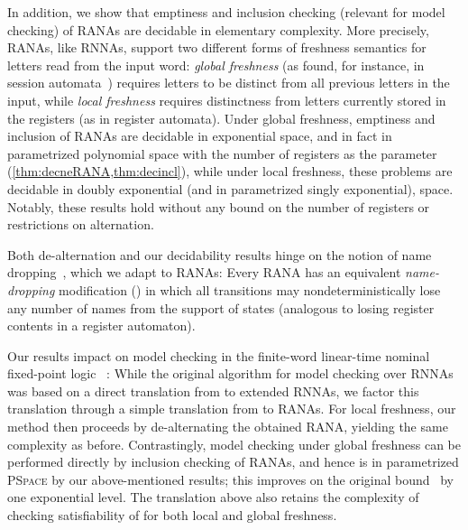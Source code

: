 \documentclass[10pt, final, conference, a4paper, twocolumn]{IEEEtran}
\newcommand{\PSPACE}{\textsc{PSpace}\xspace}
\begin{document}
In addition, we show that emptiness and inclusion checking (relevant for
model checking) of RANAs
are decidable in elementary complexity. More precisely, RANAs, like
RNNAs, support two different forms of freshness semantics for letters
read from the input word: \emph{global freshness} (as found, for
instance, in session automata~\cite{BolligEA14}) requires letters to
be distinct from all previous letters in the input, while \emph{local
  freshness} requires distinctness from letters currently stored in
the registers (as in register automata). Under global freshness,
emptiness and inclusion of RANAs are decidable in exponential space, and in
fact in parametrized polynomial space with the number of registers as
the parameter
(\cref{thm:decneRANA,thm:decincl}),
while under local freshness, these problems are decidable in doubly
exponential (and in parametrized singly exponential),
space. Notably, these results hold without any bound on the number of
registers or restrictions on alternation.

Both de-alternation and our decidability results hinge on
the notion of name dropping~\cite{skmw17}, which we adapt to RANAs:
Every RANA has an equivalent \emph{name-dropping} modification
() in which all transitions may
nondeterministically lose any number of names from the support of states
(analogous to losing register contents in a register automaton).%

Our results impact on model checking in the finite-word linear-time nominal
fixed-point logic \muBar~\cite{hms21}: While the original algorithm for model checking \muBar
over RNNAs was based on a direct translation from \muBar to extended
RNNAs, we factor this translation through a simple translation from
\muBar to RANAs. For local freshness, our method then proceeds by
de-alternating the obtained RANA, yielding the same complexity as
before. Contrastingly, model checking under global freshness can be
performed directly by inclusion checking of RANAs, and hence is in
parametrized \PSPACE by our above-mentioned results; this improves on the
original bound~\cite{hms21} by one exponential level.
The translation above also retains the complexity of checking satisfiability 
of \muBar{} for both local and global freshness. %
\end{document}
